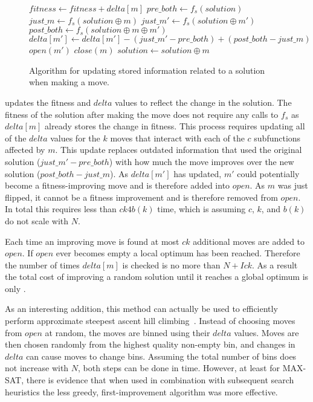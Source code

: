 \begin{figure}
  \begin{algorithmic}[1]
    \State $fitness \leftarrow fitness + delta[m]$
      \State $pre\_both \leftarrow f_s(solution)$
      \State $just\_m \leftarrow f_s(solution \oplus m)$
        \State $just\_m' \leftarrow f_s(solution \oplus m')$
        \State $post\_both \leftarrow f_s(solution \oplus m \oplus m')$
        \State $delta[m'] \leftarrow delta[m'] - (just\_m' - pre\_both) + (post\_both - just\_m)$
        \State $open(m')$
      \EndFor
    \EndFor
    \State $close(m)$
    \State $solution \leftarrow solution \oplus m$
  \EndProcedure
\end{algorithmic}
  \caption{Algorithm for updating stored information related to a solution when
           making a move.}
  \label{fig-make-move}
\end{figure}

 updates the fitness and $delta$ values to reflect the change in the solution. The fitness
of the solution after making the move does not require any calls to $f_s$ as $delta[m]$ already stores the
change in fitness. This process requires updating all of the $delta$ values for the $k$ moves that interact with each of the $c$ subfunctions
affected by $m$. This update replaces outdated information that used the original solution ($just\_m' - pre\_both$)
with how much the move improves over the new solution ($post\_both - just\_m$). As $delta[m']$ has updated, $m'$ could
potentially become a fitness-improving move and is therefore added into $open$. As $m$ was just flipped,
it cannot be a fitness improvement and is therefore removed from $open$.  In total this requires less than
$ck4b(k)$ time, which is  assuming $c$, $k$, and $b(k)$ do not scale with $N$.

Each time an improving move is found at most $ck$ additional moves are added to $open$. If $open$ ever
becomes empty a local optimum has been reached. Therefore the number of times $delta[m]$ is checked
is no more than $N + Ick$. As a result the total cost of improving a random solution until it reaches
a global optimum is only .

As an interesting addition, this method can actually be used to efficiently perform approximate steepest ascent hill
climbing~\cite{whitley:2013:greedy}. Instead of choosing moves from $open$ at random, the moves are binned
using their $delta$ values. Moves are then chosen randomly from the highest quality non-empty bin, and changes
in $delta$ can cause moves to change bins. Assuming the total number of bins does not increase with $N$, both steps
can be done in  time. However, at least for MAX-SAT, there is evidence that when used in combination with subsequent
search heuristics the less greedy,
first-improvement algorithm was more effective.

